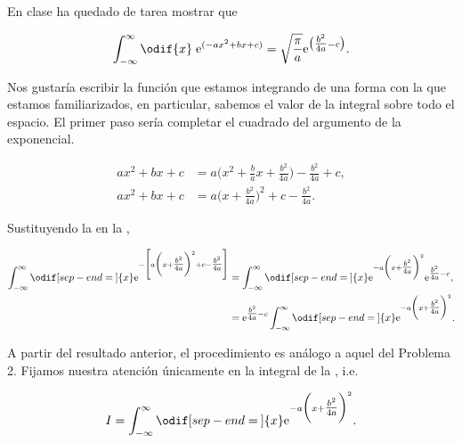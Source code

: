 \documentclass[../main.tex]{subfiles}
\begin{document}
\begin{problema}
	En clase ha quedado de tarea mostrar que

	\begin{equation}
		\int_{-\infty}^{\infty} \odif{x}\;\mathrm{e}^{( -ax^{2} + bx + c )} = \sqrt{\dfrac{\pi}{a}}
		\mathrm{e}^{\bigl(\tfrac{b^{2}}{4a} - c\bigr)}.
		\label{eq:int_res}
	\end{equation}

	\startsolution

	Nos gustaría escribir la función que estamos integrando de una
	forma con la que estamos familiarizados, en particular, sabemos
	el valor de la integral sobre todo el espacio. El primer paso sería
	completar el cuadrado del argumento de la exponencial.

	\begin{align}
		ax^{2} + bx + c & = a \biggl(x^{2} + \tfrac{b}{a}x + \tfrac{b^{2}}{4a}\biggr) - \tfrac{b^{2}}{4a} + c ,\nonumber \\
		ax^{2} + bx + c & = a \biggl(x + \tfrac{b^{2}}{4a}\biggr)^{2} + c - \tfrac{b^{2}}{4a}.
		\label{eq:complete-square}
	\end{align}

	Sustituyendo la  en la ,

	\begin{align}
		\int_{-\infty}^{\infty}\odif[sep-end=\medspace]{x} \mathrm{e}^{-\Biggl[a \biggl(x + \tfrac{b^{2}}{4a}\biggr)^{2} + c - \tfrac{b^{2}}{4a}\Biggr]} & = \int_{-\infty}^{\infty}\odif[sep-end=\medspace]{x} \mathrm{e}^{-a \biggl(x + \tfrac{b^{2}}{4a}\biggr)^{2}}\mathrm{e}^{\tfrac{b^{2}}{4a} - c},\nonumber \\
		                                                                                                                                                 & = \mathrm{e}^{\tfrac{b^{2}}{4a} - c}\int_{-\infty}^{\infty}\odif[sep-end=\medspace]{x}\mathrm{e}^{-a \biggl(x + \tfrac{b^{2}}{4a}\biggr)^{2}}.
		\label{eq:int_square}
	\end{align}

	A partir del resultado anterior, el procedimiento es análogo a aquel del
	Problema 2. Fijamos nuestra atención únicamente en la integral de la
	, i.e.

	\begin{equation*}
		I = \int_{-\infty}^{\infty}\odif[sep-end=\medspace]{x}\mathrm{e}^{-a \biggl(x + \tfrac{b^{2}}{4a}\biggr)^{2}}.
	\end{equation*}


\end{problema}
\end{document}
